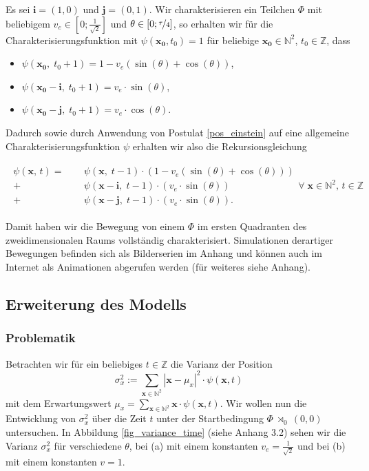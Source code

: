\documentclass[a4paper,12pt,ngerman]{scrartcl}
\theoremstyle{plain}
\theoremstyle{plain}
\theoremstyle{plain}
\theoremstyle{plain}
\newcommand{\Z}{\mathbb{Z}}
\newcommand{\N}{\mathbb{N}}
\newcommand{\at}[1]{\;\rtimes_{#1}\;}
\begin{document}
Es sei $\pmb{i}=(1,0)$ und $\pmb{j}=(0,1)$. Wir charakterisieren ein Teilchen $\Phi$ mit beliebigem $v_e\in[0;\frac{1}{\sqrt{2}}]$ und $\theta\in[0;\nicefrac{\tau}{4}]$, so erhalten wir für die Charakterisierungsfunktion mit $\psi(\pmb{x_0},t_0)=1$ für beliebige $\pmb{x_0}\in\N^2$, $t_0\in\Z$, dass 

{
\begin{itemize}
\item $\psi(\pmb{x_0},\;t_0+1)=1-v_e(\sin(\theta)+\cos(\theta))$,
\item $\psi(\pmb{x_0}-\pmb{i},\;t_0+1)=v_e\cdot\sin(\theta)$,
\item $\psi(\pmb{x_0}-\pmb{j},\;t_0+1)=v_e\cdot\cos(\theta)$.
\end{itemize}
}
Dadurch sowie durch Anwendung von Postulat \ref{pos_einstein} auf eine allgemeine Charakterisierungsfunktion $\psi$ erhalten wir also die Rekursionsgleichung

\begin{align*}
\begin{split}
\psi(\pmb{x},\,t)=\phantom{+}&\psi(\pmb{x},\;t-1)\cdot(1-v_e(\sin(\theta)+\cos(\theta)))\\
+\,&\psi(\pmb{x}-\pmb{i},\;t-1)\cdot(v_e\cdot\sin(\theta))\\
+\,&\psi(\pmb{x}-\pmb{j},\;t-1)\cdot(v_e\cdot\sin(\theta)).
\end{split} \forall\;\pmb{x}\in\N^2,\,t\in\Z
\end{align*}

Damit haben wir die Bewegung von einem $\Phi$ im ersten Quadranten des zweidimensionalen Raums vollständig charakterisiert. Simulationen derartiger Bewegungen befinden sich als Bilderserien im Anhang und können auch im Internet als Animationen abgerufen werden (für weiteres siehe Anhang).

\subsection{Erweiterung des Modells}

\subsubsection{Problematik}

Betrachten wir für ein beliebiges $t\in\Z$ die Varianz der Position
\[\sigma_x^2:=\sum_{\pmb{x}\in\N^2}|\pmb{x}-\mu_x|^2\cdot\psi(\pmb{x},t)\]
mit dem Erwartungswert $\mu_x=\sum_{\pmb{x}\in\N^2}\pmb{x}\cdot\psi(\pmb{x},t)$. Wir wollen nun die Entwicklung von $\sigma_x^2$ über die Zeit $t$ unter der Startbedingung $\Phi\at{0}(0,0)$ untersuchen. In Abbildung \ref{fig_variance_time} (siehe Anhang 3.2) sehen wir die Varianz $\sigma_x^2$ für verschiedene $\theta$, bei (a) mit einem konstanten $v_e=\frac{1}{\sqrt{2}}$ und bei (b) mit einem konstanten $v=1$.
\end{document}
